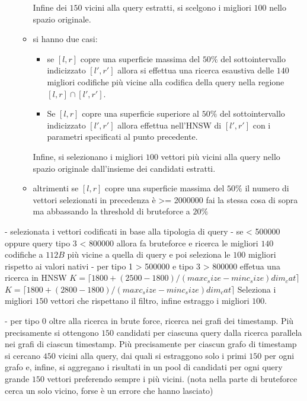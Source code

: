 \begin{itemize}
\begin{itemize}
\begin{itemize}
        \end{itemize}
        Infine dei $150$ vicini alla query estratti, si scelgono i migliori $100$ 
        nello spazio originale.
        \item si hanno due casi:
        \begin{itemize}
            \item se $[l,r]$ copre una superficie massima del $50\%$ del sottointervallo
            indicizzato $ [l',r']$ allora si effettua una ricerca esaustiva delle $140$ 
            migliori codifiche più vicine alla codifica della query nella regione $[l,r] \cap [l',r']$.
            \item Se $[l,r]$ copre una superficie superiore al $50\%$ del sottointervallo
            indicizzato $ [l',r']$ allora effettua nell'HNSW di $ [l',r']$ con i parametri 
            specificati al punto precedente.
        \end{itemize} 
        Infine, si selezionano i migliori $100$ vettori più vicini alla query nello 
        spazio originale dall'insieme dei candidati estratti.
        \item altrimenti se $[l,r]$ copre una superficie massima del $50\%$ il numero di vettori selezionati in precedenza è >= 2000000 fai la stessa 
        cosa di sopra ma abbassando la threshold di bruteforce a  $20\%$
    \end{itemize}
\end{itemize}




- selezionata i vettori codificati in base alla tipologia di query
- se < 500000 oppure query tipo 3 < 800000 allora fa bruteforce e ricerca le migliori $140$ codifiche a $112 B$
più vicine a quella di query e poi seleziona le $100$ migliori rispetto ai valori 
nativi
- per tipo 1 > 500000 e tipo 3 > 800000  effetua una ricerca in HNSW $K= \lceil1800+(2500-1800)/(maxc_size - minc_size)dim_cat\rceil$
 $K= \lceil1800+(2800-1800)/(maxc_size - minc_size)dim_cat\rceil$
 Seleziona i migliori $150$ vettori che rispettano il filtro, infine estraggo i 
 migliori $100$.

- per tipo 0 oltre alla ricerca in brute force, ricerca nei grafi dei timestamp.
 Più precisamente si ottengono $150$ candidati per ciascuna query dalla ricerca 
 parallela nei grafi di ciascun timestamp. Più precisamente per ciascun grafo di 
 timestamp si cercano $450$ vicini alla query, dai quali si estraggono solo i primi 
 $150$ per ogni grafo e, infine, si aggregano i risultati in un pool 
 di candidati per ogni query grande $150$ vettori preferendo sempre i più vicini.
 (nota nella parte di bruteforce cerca un solo vicino, forse è un errore che hanno 
 lasciato)

